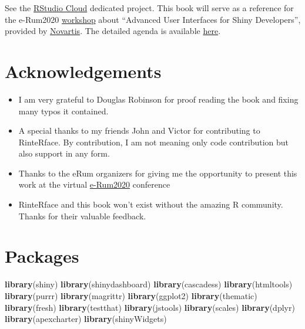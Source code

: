 \documentclass[
]{book}
\newenvironment{Shaded}{\begin{snugshade}}{\end{snugshade}}
\newcommand{\KeywordTok}[1]{\textcolor[rgb]{0.13,0.29,0.53}{\textbf{#1}}}
\newcommand{\NormalTok}[1]{#1}
\providecommand{\tightlist}{%
  \setlength{\itemsep}{0pt}\setlength{\parskip}{0pt}}
\begin{document}
See the \href{https://rstudio.cloud}{RStudio Cloud} dedicated project.
This book will serve as a reference for the e-Rum2020 \href{https://2020.erum.io/program/workshops/}{workshop} about ``Advanced User Interfaces for Shiny Developers'', provided by \href{https://www.novartis.com}{Novartis}. The detailed agenda is available \href{https://github.com/Novartis/Advanced-User-Interfaces-for-Shiny-Developers}{here}.

\hypertarget{acknowledgements}{%
\section*{Acknowledgements}\label{acknowledgements}}

\begin{itemize}
\tightlist
\item
  I am very grateful to Douglas Robinson for proof reading the book and fixing many typos it contained.
\item
  A special thanks to my friends John and Victor for contributing to RinteRface. By contribution, I am not meaning only code contribution but also support in any form.
\item
  Thanks to the eRum organizers for giving me the opportunity to present this work at the virtual \href{https://2020.erum.io}{e-Rum2020} conference
\item
  RinteRface and this book won't exist without the amazing R community. Thanks for their valuable feedback.
\end{itemize}

\hypertarget{packages}{%
\section*{Packages}\label{packages}}

\begin{Shaded}
\begin{Highlighting}[]
\KeywordTok{library}\NormalTok{(shiny)}
\KeywordTok{library}\NormalTok{(shinydashboard)}
\KeywordTok{library}\NormalTok{(cascadess)}
\KeywordTok{library}\NormalTok{(htmltools)}
\KeywordTok{library}\NormalTok{(purrr)}
\KeywordTok{library}\NormalTok{(magrittr)}
\KeywordTok{library}\NormalTok{(ggplot2)}
\KeywordTok{library}\NormalTok{(thematic)}
\KeywordTok{library}\NormalTok{(fresh)}
\KeywordTok{library}\NormalTok{(testthat)}
\KeywordTok{library}\NormalTok{(jstools)}
\KeywordTok{library}\NormalTok{(scales)}
\KeywordTok{library}\NormalTok{(dplyr)}
\KeywordTok{library}\NormalTok{(apexcharter)}
\KeywordTok{library}\NormalTok{(shinyWidgets)}
\end{Highlighting}
\end{Shaded}
\end{document}
